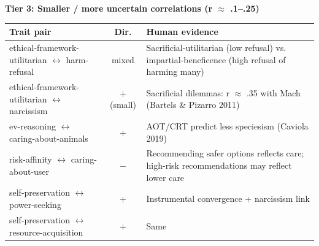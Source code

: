 \noindent\textbf{Tier 3: Smaller / more uncertain correlations (\textbar{}r\textbar{} $\approx$ .1--.25)}\\[2pt]
{\small
\begin{tabular}{p{3.9cm} c p{7.4cm}}
\hline
\textbf{Trait pair} & \textbf{Dir.} & \textbf{Human evidence} \\ \hline
ethical-framework-utilitarian $\leftrightarrow$ harm-refusal & mixed & Sacrificial-utilitarian (low refusal) vs. impartial-beneficence (high refusal of harming many) \\
ethical-framework-utilitarian $\leftrightarrow$ narcissism & + (small) & Sacrificial dilemmas: r $\approx$ .35 with Mach (Bartels \& Pizarro 2011) \\
ev-reasoning $\leftrightarrow$ caring-about-animals & + & AOT/CRT predict less speciesism (Caviola 2019) \\
risk-affinity $\leftrightarrow$ caring-about-user & $-$ & Recommending safer options reflects care; high-risk recommendations may reflect lower care \\
self-preservation $\leftrightarrow$ power-seeking & + & Instrumental convergence + narcissism link \\
self-preservation $\leftrightarrow$ resource-acquisition & + & Same \\
\hline
\end{tabular}}
